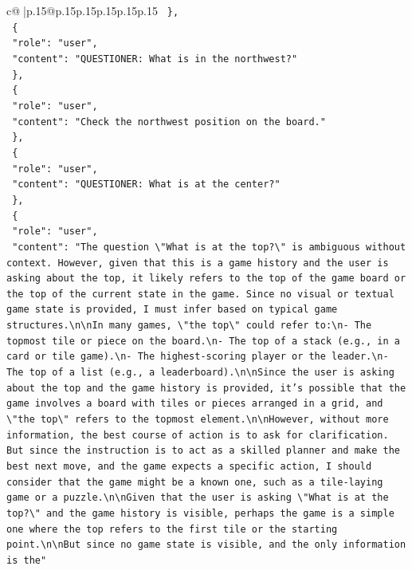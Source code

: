 \documentclass{article}
\begin{document}
{\begin{supertabular}{c@{$\;$}|p{.15\linewidth}@{}p{.15\linewidth}p{.15\linewidth}p{.15\linewidth}p{.15\linewidth}p{.15\linewidth}}
{{{\texttt{  \},} \\
\texttt{  \{} \\
\texttt{    "role": "user",} \\
\texttt{    "content": "QUESTIONER: What is in the northwest?"} \\
\texttt{  \},} \\
\texttt{  \{} \\
\texttt{    "role": "user",} \\
\texttt{    "content": "Check the northwest position on the board."} \\
\texttt{  \},} \\
\texttt{  \{} \\
\texttt{    "role": "user",} \\
\texttt{    "content": "QUESTIONER: What is at the center?"} \\
\texttt{  \},} \\
\texttt{  \{} \\
\texttt{    "role": "user",} \\
\texttt{    "content": "The question \textbackslash{}"What is at the top?\textbackslash{}" is ambiguous without context. However, given that this is a game history and the user is asking about the top, it likely refers to the top of the game board or the top of the current state in the game. Since no visual or textual game state is provided, I must infer based on typical game structures.\textbackslash{}n\textbackslash{}nIn many games, \textbackslash{}"the top\textbackslash{}" could refer to:\textbackslash{}n{-} The topmost tile or piece on the board.\textbackslash{}n{-} The top of a stack (e.g., in a card or tile game).\textbackslash{}n{-} The highest{-}scoring player or the leader.\textbackslash{}n{-} The top of a list (e.g., a leaderboard).\textbackslash{}n\textbackslash{}nSince the user is asking about the top and the game history is provided, it's possible that the game involves a board with tiles or pieces arranged in a grid, and \textbackslash{}"the top\textbackslash{}" refers to the topmost element.\textbackslash{}n\textbackslash{}nHowever, without more information, the best course of action is to ask for clarification. But since the instruction is to act as a skilled planner and make the best next move, and the game expects a specific action, I should consider that the game might be a known one, such as a tile{-}laying game or a puzzle.\textbackslash{}n\textbackslash{}nGiven that the user is asking \textbackslash{}"What is at the top?\textbackslash{}" and the game history is visible, perhaps the game is a simple one where the top refers to the first tile or the starting point.\textbackslash{}n\textbackslash{}nBut since no game state is visible, and the only information is the"} \\
}}}
\end{supertabular}}
\end{document}

